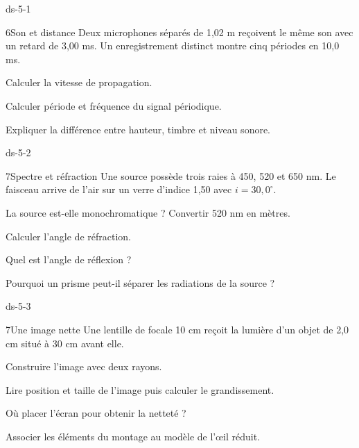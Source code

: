 \begin{blocLivre}{ds-5-1}\begin{exoBac}{6}{Son et distance}
Deux microphones séparés de 1,02 m reçoivent le même son avec un retard de 3,00 ms. Un enregistrement distinct montre cinq périodes en 10,0 ms.
\begin{questions}
\item Calculer la vitesse de propagation.
\item Calculer période et fréquence du signal périodique.
\item Expliquer la différence entre hauteur, timbre et niveau sonore.
\end{questions}
\end{exoBac}\end{blocLivre}
\begin{blocLivre}{ds-5-2}\begin{exoBac}{7}{Spectre et réfraction}
Une source possède trois raies à 450, 520 et 650 nm. Le faisceau arrive de l’air sur un verre d’indice 1,50 avec $i=30,0^\circ$.
\begin{questions}
\item La source est-elle monochromatique ? Convertir 520 nm en mètres.
\item Calculer l’angle de réfraction.
\item Quel est l’angle de réflexion ?
\item Pourquoi un prisme peut-il séparer les radiations de la source ?
\end{questions}
\end{exoBac}\end{blocLivre}
\begin{blocLivre}{ds-5-3}\begin{exoBac}{7}{Une image nette}
Une lentille de focale 10 cm reçoit la lumière d’un objet de 2,0 cm situé à 30 cm avant elle.
\begin{questions}
\item Construire l’image avec deux rayons.
\item Lire position et taille de l’image puis calculer le grandissement.
\item Où placer l’écran pour obtenir la netteté ?
\item Associer les éléments du montage au modèle de l’œil réduit.
\end{questions}
\end{exoBac}\end{blocLivre}

